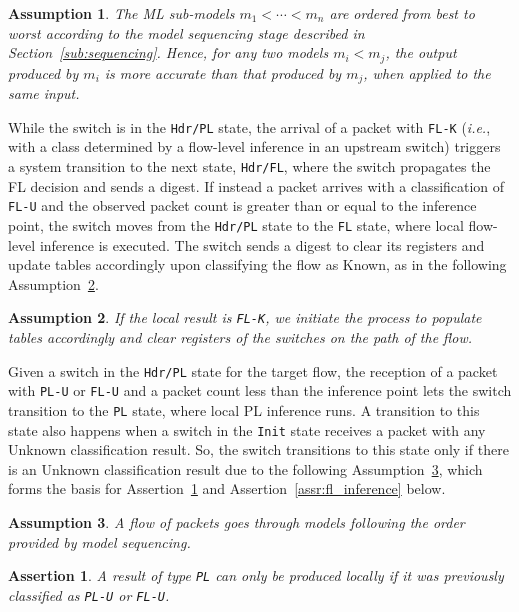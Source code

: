 \documentclass[journal]{IEEEtran}
\theoremstyle{plain} %
\newtheorem{assumption}{Assumption}[section]
\newtheorem{assertion}{Assertion}
\newcommand{\ie}{\textit{i.e.},\xspace}
\newcommand*\numO[1]{\raisebox{.5pt}{\textcircled{\raisebox{-.9pt} {#1}}}}
\begin{document}
\begin{assumption}
  The ML sub-models \(m_1<\dotsb<m_n\) are ordered from best to worst according to the model sequencing stage \numO{5} described in Section~\ref{sub:sequencing}.
  Hence, for any two models \(m_i<m_j\), the output produced by \(m_i\) is more accurate than that produced by \(m_j\), when applied to the same input.
  \label{ass:model_order}
\end{assumption}

While the switch is in the \texttt{Hdr/PL} state, the arrival of a packet with \texttt{FL-K} (\ie with a class determined by a flow-level inference in an upstream switch) triggers a system transition to the next state, \texttt{Hdr/FL}, where the switch propagates the FL decision and sends a digest. If instead a packet arrives with a classification of \texttt{FL-U} and the observed packet count is greater than or equal to the inference point, the switch moves from the \texttt{Hdr/PL} state to the \texttt{FL} state, where local flow-level inference is executed. The switch sends a digest to clear its registers and update tables accordingly upon classifying the flow as Known, as in the following Assumption~\ref{ass:local_FL_K}.

\begin{assumption}
  If the local result is \texttt{FL-K}, we initiate the process to populate tables accordingly and clear registers of the switches
        on the path of the flow.
    \label{ass:local_FL_K}
\end{assumption}

Given a switch in the \texttt{Hdr/PL} state for the target flow, the reception of a packet with \texttt{PL-U} or \texttt{FL-U} and a packet count less than the inference point lets the switch transition to the \texttt{PL} state, where local PL inference runs. A transition to this state also happens when a switch in the \texttt{Init} state receives a packet with any Unknown classification result. So, the switch transitions to this state only if there is an Unknown classification result due to the following Assumption~\ref{ass:packet_order}, which forms the basis for Assertion~\ref{assr:pl_state} and Assertion~\ref{assr:fl_inference} below.

\begin{assumption}
    A flow of packets goes through models following the order
        provided by model sequencing.
        \label{ass:packet_order}
\end{assumption}

\begin{assertion}
A result of type \texttt{PL} can only be produced locally if it was previously classified as \texttt{PL-U} or \texttt{FL-U}.
\label{assr:pl_state}
\end{assertion}
\end{document}
